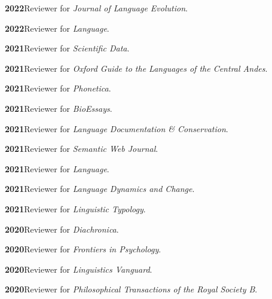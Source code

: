 \documentclass[11pt]{article}
\newcommand{\hangpara}{
 \setlength{\parindent}{0in} %
 \hangindent=0.42in %
}
\begin{document}
\vskip 6pt
\hangpara
{\bf 2022}\hspace{1ex}Reviewer for \textit{Journal of Language Evolution}.

\vskip 6pt
\hangpara
{\bf 2022}\hspace{1ex}Reviewer for \textit{Language}.

\vskip 6pt
\hangpara
{\bf 2021}\hspace{1ex}Reviewer for \textit{Scientific Data}.

\vskip 6pt
\hangpara
{\bf 2021}\hspace{1ex}Reviewer for \textit{Oxford Guide to the Languages of the Central Andes}.

\vskip 6pt
\hangpara
{\bf 2021}\hspace{1ex}Reviewer for \textit{Phonetica}.

\vskip 6pt
\hangpara
{\bf 2021}\hspace{1ex}Reviewer for \textit{BioEssays}.

\vskip 6pt
\hangpara
{\bf 2021}\hspace{1ex}Reviewer for \textit{Language Documentation \& Conservation}.

\vskip 6pt
\hangpara
{\bf 2021}\hspace{1ex}Reviewer for \textit{Semantic Web Journal}.

\hangpara
\vskip 6pt
{\bf 2021}\hspace{1ex}Reviewer for \textit{Language}.

\vskip 6pt
\hangpara
{\bf 2021}\hspace{1ex}Reviewer for \textit{Language Dynamics and Change}.

\vskip 6pt
\hangpara
{\bf 2021}\hspace{1ex}Reviewer for \textit{Linguistic Typology}.

\vskip 6pt
\hangpara
{\bf 2020}\hspace{1ex}Reviewer for \textit{Diachronica}.

\vskip 6pt
\hangpara
{\bf 2020}\hspace{1ex}Reviewer for \textit{Frontiers in Psychology}.

\vskip 6pt
\hangpara
{\bf 2020}\hspace{1ex}Reviewer for \textit{Linguistics Vanguard}.

\vskip 6pt
\hangpara
{\bf 2020}\hspace{1ex}Reviewer for \textit{Philosophical Transactions of the Royal Society B}.
\end{document}

